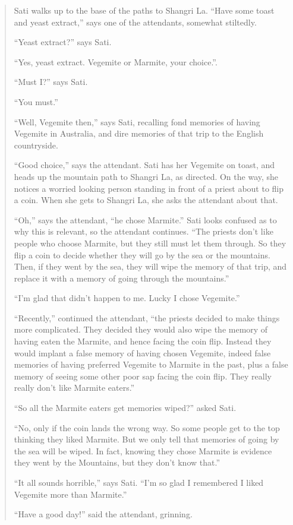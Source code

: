 \documentclass[
  10pt,
  letterpaper,
  DIV=11,
  numbers=noendperiod,
  twoside]{scrartcl}
\begin{document}
\begin{quote}
Sati walks up to the base of the paths to Shangri La. ``Have some toast
and yeast extract,'' says one of the attendants, somewhat stiltedly.

``Yeast extract?'' says Sati.

``Yes, yeast extract. Vegemite or Marmite, your choice.''.

``Must I?'' says Sati.

``You must.''

``Well, Vegemite then,'' says Sati, recalling fond memories of having
Vegemite in Australia, and dire memories of that trip to the English
countryside.

``Good choice,'' says the attendant. Sati has her Vegemite on toast, and
heads up the mountain path to Shangri La, as directed. On the way, she
notices a worried looking person standing in front of a priest about to
flip a coin. When she gets to Shangri La, she asks the attendant about
that.

``Oh,'' says the attendant, ``he chose Marmite.'' Sati looks confused as
to why this is relevant, so the attendant continues. ``The priests don't
like people who choose Marmite, but they still must let them through. So
they flip a coin to decide whether they will go by the sea or the
mountains. Then, if they went by the sea, they will wipe the memory of
that trip, and replace it with a memory of going through the
mountains.''

``I'm glad that didn't happen to me. Lucky I chose Vegemite.''

``Recently,'' continued the attendant, ``the priests decided to make
things more complicated. They decided they would also wipe the memory of
having eaten the Marmite, and hence facing the coin flip. Instead they
would implant a false memory of having chosen Vegemite, indeed false
memories of having preferred Vegemite to Marmite in the past, plus a
false memory of seeing some other poor sap facing the coin flip. They
really really don't like Marmite eaters.''

``So all the Marmite eaters get memories wiped?'' asked Sati.

``No, only if the coin lands the wrong way. So some people get to the
top thinking they liked Marmite. But we only tell that memories of going
by the sea will be wiped. In fact, knowing they chose Marmite is
evidence they went by the Mountains, but they don't know that.''

``It all sounds horrible,'' says Sati. ``I'm so glad I remembered I
liked Vegemite more than Marmite.''

``Have a good day!'' said the attendant, grinning.
\end{quote}
\end{document}
